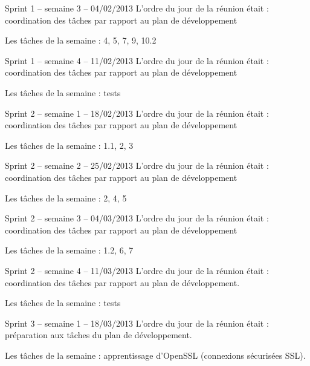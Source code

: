 \documentclass[a4paper,11pt,french]{article}
\begin{document}
\begin{paragraph}{Sprint 1 -- semaine 3 -- 04/02/2013}
L’ordre du jour de la réunion était : coordination des tâches par rapport au plan de développement

Les tâches de la semaine : 4, 5, 7, 9, 10.2
\end{paragraph}

\begin{paragraph}{Sprint 1 -- semaine 4 -- 11/02/2013}
L’ordre du jour de la réunion était : coordination des tâches par rapport au plan de développement

Les tâches de la semaine : tests
\end{paragraph}

\begin{paragraph}{Sprint 2 -- semaine 1 -- 18/02/2013}
L’ordre du jour de la réunion était : coordination des tâches par rapport au plan de développement

Les tâches de la semaine : 1.1, 2, 3
\end{paragraph}

\begin{paragraph}{Sprint 2 -- semaine 2 -- 25/02/2013}
L’ordre du jour de la réunion était : coordination des tâches par rapport au plan de développement

Les tâches de la semaine : 2, 4, 5
\end{paragraph}

\begin{paragraph}{Sprint 2 -- semaine 3 -- 04/03/2013}
L’ordre du jour de la réunion était : coordination des tâches par rapport au plan de développement

Les tâches de la semaine : 1.2, 6, 7
\end{paragraph}

\begin{paragraph}{Sprint 2 -- semaine 4 -- 11/03/2013}
L’ordre du jour de la réunion était : coordination des tâches par rapport au plan de développement.

Les tâches de la semaine : tests
\end{paragraph}

\begin{paragraph}{Sprint 3 -- semaine 1 -- 18/03/2013}
L’ordre du jour de la réunion était : préparation aux tâches du plan de développement.

Les tâches de la semaine : apprentissage d'OpenSSL (connexions sécurisées SSL).
\end{paragraph}
\end{document}
